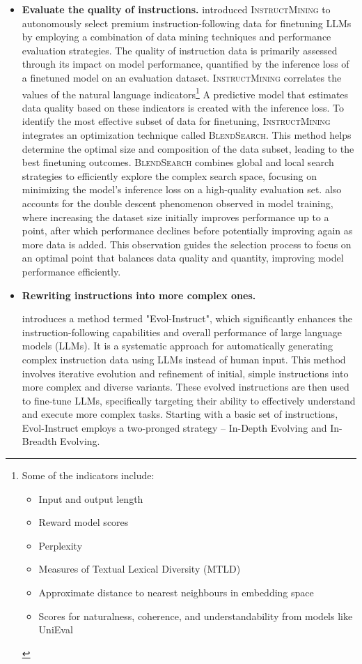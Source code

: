 \begin{itemize}
{	      }
	\item \textbf{Evaluate the quality of instructions.}{
		      \textcite{cao2023instruction} introduced \textsc{InstructMining} to autonomously select premium instruction-following data for finetuning LLMs by employing a combination of data mining techniques and performance evaluation strategies.
		      The quality of instruction data is primarily assessed through its impact on model performance, quantified by the inference loss of a finetuned model on an evaluation dataset. \textsc{InstructMining} correlates the values of the natural language indicators\footnote{Some of the indicators include:
			      \begin{itemize}
				      \item Input and output length
				      \item Reward model scores
				      \item Perplexity
				      \item Measures of Textual Lexical Diversity (MTLD)
				      \item Approximate distance to nearest neighbours in embedding space
				      \item Scores for naturalness, coherence, and understandability from models like UniEval
			      \end{itemize}
		      }
		      A predictive model that estimates data quality based on these indicators is created with the inference loss.
		      To identify the most effective subset of data for finetuning, \textsc{InstructMining} integrates an optimization technique called \textsc{BlendSearch}. This method helps determine the optimal size and composition of the data subset, leading to the best finetuning outcomes. \textsc{BlendSearch} combines global and local search strategies to efficiently explore the complex search space, focusing on minimizing the model’s inference loss on a high-quality evaluation set.
		      \textcite{cao2023instruction} also accounts for the double descent phenomenon observed in model training, where increasing the dataset size initially improves performance up to a point, after which performance declines before potentially improving again as more data is added. This observation guides the selection process to focus on an optimal point that balances data quality and quantity, improving model performance efficiently.
	      }
	\item \textbf{Rewriting instructions into more complex ones.} {
	      \textcite{xu2023wizardlm} introduces a method termed "Evol-Instruct", which significantly enhances the instruction-following capabilities and overall performance of large language models (LLMs). It is a systematic approach for automatically generating complex instruction data using LLMs instead of human input. This method involves iterative evolution and refinement of initial, simple instructions into more complex and diverse variants. These evolved instructions are then used to fine-tune LLMs, specifically targeting their ability to effectively understand and execute more complex tasks. Starting with a basic set of instructions, Evol-Instruct employs a two-pronged strategy -- In-Depth Evolving and In-Breadth Evolving.

}
\end{itemize}
